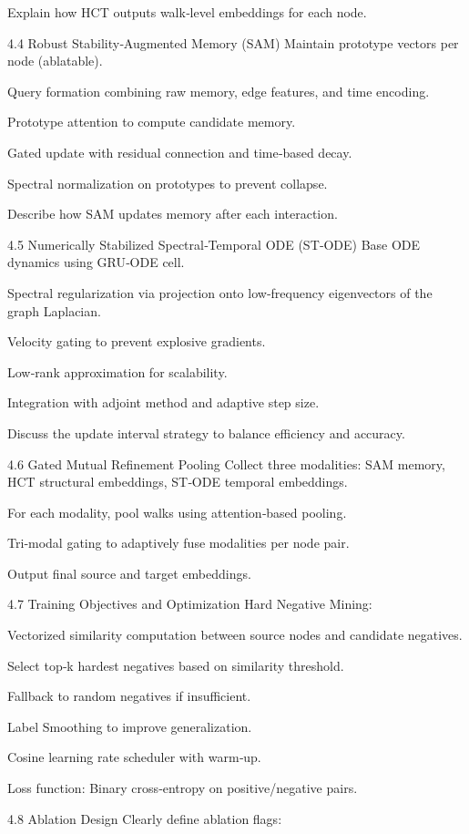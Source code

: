 \documentclass{report}
\begin{document}
Explain how HCT outputs walk‑level embeddings for each node.

4.4 Robust Stability‑Augmented Memory (SAM)
Maintain prototype vectors per node (ablatable).

Query formation combining raw memory, edge features, and time encoding.

Prototype attention to compute candidate memory.

Gated update with residual connection and time‑based decay.

Spectral normalization on prototypes to prevent collapse.

Describe how SAM updates memory after each interaction.

4.5 Numerically Stabilized Spectral‑Temporal ODE (ST‑ODE)
Base ODE dynamics using GRU‑ODE cell.

Spectral regularization via projection onto low‑frequency eigenvectors of the graph Laplacian.

Velocity gating to prevent explosive gradients.

Low‑rank approximation for scalability.

Integration with adjoint method and adaptive step size.

Discuss the update interval strategy to balance efficiency and accuracy.

4.6 Gated Mutual Refinement Pooling
Collect three modalities: SAM memory, HCT structural embeddings, ST‑ODE temporal embeddings.

For each modality, pool walks using attention‑based pooling.

Tri‑modal gating to adaptively fuse modalities per node pair.

Output final source and target embeddings.

4.7 Training Objectives and Optimization
Hard Negative Mining:

Vectorized similarity computation between source nodes and candidate negatives.

Select top‑k hardest negatives based on similarity threshold.

Fallback to random negatives if insufficient.

Label Smoothing to improve generalization.

Cosine learning rate scheduler with warm‑up.

Loss function: Binary cross‑entropy on positive/negative pairs.

4.8 Ablation Design
Clearly define ablation flags:
\end{document}
